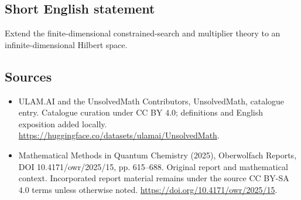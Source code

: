 \documentclass[11pt]{article}
\begin{document}
\subsection{Short English statement}
Extend the finite-dimensional constrained-search and multiplier theory to an infinite-dimensional Hilbert space.
\subsection{Sources}
\begin{itemize}
\item[\hypertarget{source:statement:1}{S1}] ULAM.AI and the UnsolvedMath Contributors, UnsolvedMath, catalogue entry. Catalogue curation under CC BY 4.0; definitions and English exposition added locally.
\url{https://huggingface.co/datasets/ulamai/UnsolvedMath}.
\item[\hypertarget{source:statement:2}{S2}] Mathematical Methods in Quantum Chemistry (2025), Oberwolfach Reports, DOI 10.4171/owr/2025/15, pp. 615--688. Original report and mathematical context. Incorporated report material remains under the source CC BY-SA 4.0 terms unless otherwise noted.
\url{https://doi.org/10.4171/owr/2025/15}.
\end{itemize}
\label{end:statement}
\end{document}
